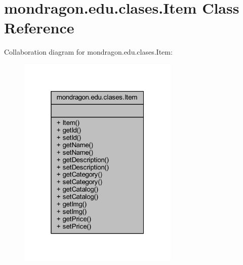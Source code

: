 \hypertarget{classmondragon_1_1edu_1_1clases_1_1_item}{}\section{mondragon.\+edu.\+clases.\+Item Class Reference}
\label{classmondragon_1_1edu_1_1clases_1_1_item}


Collaboration diagram for mondragon.\+edu.\+clases.\+Item\+:\nopagebreak
\begin{figure}[H]
\begin{center}
\leavevmode
\includegraphics[width=217pt]{classmondragon_1_1edu_1_1clases_1_1_item__coll__graph}
\end{center}
\end{figure}
